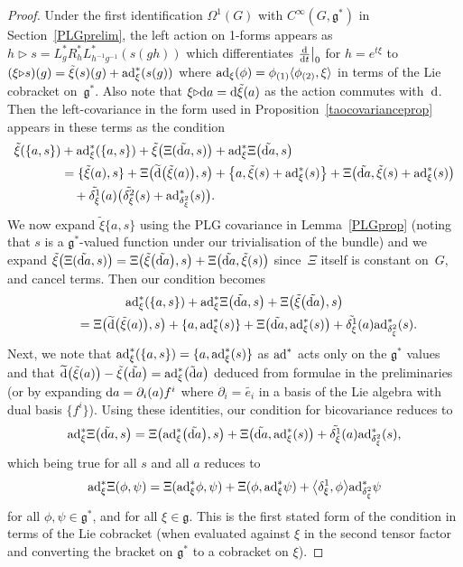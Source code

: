 \documentclass[10pt,a4paper]{amsart}
\numberwithin{equation}{section}
\newcommand{\<}{{\langle}}
\renewcommand{\>}{{\rangle}}
\renewcommand{\o}{{}_{\scriptstyle(1)}}
\renewcommand{\t}{{}_{\scriptstyle(2)}}
\newcommand{\extd}{{\rm d}}
\newcommand{\del}{{\partial}}
\newcommand{\la}{{\triangleright}}
\newcommand{\cg}{{\mathfrak{g}}}
\begin{document}
\begin{proof} Under the first identification $\Omega^1(G)$ with $C^\infty(G,\cg^*)$ in Section~\ref{PLGprelim}, the left action on 1-forms appears as $h\la s= L_g^*R_h^*L^*_{h^{-1}g^{-1}}(s(gh))$ which differentiates ${\extd \over\extd t}\big|_0$ for $h=e^{t\xi}$ to $(\xi\la s)(g)=\tilde\xi(s)(g)+ {\rm ad}_\xi^*(s(g))$ where ${\rm ad}_\xi(\phi)=\phi\o\<\phi\t,\xi\>$ in terms of the Lie cobracket on~$\cg^*$. Also note that $\xi\la\extd a=\extd\tilde\xi(a)$ as the action commutes with~$\extd$. Then the left-covariance in the form used in Proposition~\ref{taocovarianceprop} appears in these terms as the condition
\begin{align*} \tilde\xi(\{a,s\})&+{\rm ad}_\xi^*(\{a,s\})+ \tilde\xi\big(\Xi(\tilde{\extd a},s)\big) + {\rm ad}_\xi^*\Xi\big(\tilde{\extd a},s\big)\\
&=\{\tilde\xi(a),s\}+\Xi\big(\widetilde{\extd} \big(\tilde\xi(a)\big),s\big)+ \big\{a,\tilde\xi(s)+ {\rm ad}_\xi^*(s)\big\}+\Xi\big(\tilde{\extd a},\tilde\xi(s)+{\rm ad}_\xi^*(s)\big)\\
&\quad+\tilde{\delta^1_\xi}(a)\big(\tilde{\delta^2_\xi}(s)+{\rm ad}^*_{\delta^2_\xi}(s)\big).
\end{align*}
We now expand $\tilde\xi\{a,s\}$ using the PLG covariance in Lemma~\ref{PLGprop} (noting that $s$ is a $\cg^*$-valued function under our trivialisation of the bundle) and we expand $\tilde\xi\big(\Xi(\tilde{\extd a},s)\big)=\Xi\big(\tilde\xi\big(\tilde{\extd a}\big),s\big)+\Xi\big(\tilde{\extd a},\tilde\xi(s)\big)$ since~$\Xi$ itself is constant on~$G$, and cancel terms. Then our condition becomes
\begin{gather*}
{\rm ad}_\xi^*(\{a,s\})+ {\rm ad}_\xi^*\Xi\big(\tilde{\extd a},s\big)+ \Xi\big(\tilde\xi\big(\tilde{\extd a}\big),s\big)\\
\qquad{} =\Xi\big(\widetilde{\extd} \big(\tilde\xi(a)\big),s\big)+ \{a, {\rm ad}_\xi^*(s)\}+\Xi\big(\tilde{\extd a},{\rm ad}_\xi^*(s)\big)+\tilde{\delta^1_\xi}(a){\rm ad}^*_{\delta^2_\xi}(s).
\end{gather*}
Next, we note that ${\rm ad}_\xi^*(\{a,s\})= \{a, {\rm ad}_\xi^*(s)\}$ as ${\rm ad}^*$ acts only on the $\cg^*$ values and that $\widetilde{\extd} \big(\tilde\xi(a)\big)- \tilde\xi\big(\tilde{\extd a}\big)={\rm ad}_\xi^*\big(\tilde\extd a\big)$ deduced from formulae in the preliminaries (or by expanding $\extd a=\del_i(a)f^i$ where $\del_i=\tilde{e_i}$ in a basis of the Lie algebra with dual basis $\{f^i\}$). Using these identities, our condition for bicovariance reduces to
\[ {\rm ad}_\xi^*\Xi\big(\tilde{\extd a},s\big)=\Xi\big({\rm ad}_\xi^*\big(\tilde{\extd a}\big),s\big)+\Xi\big(\tilde{\extd a},{\rm ad}_\xi^*(s)\big)+\tilde{\delta^1_\xi}(a){\rm ad}^*_{\delta^2_\xi}(s),\]
which being true for all $s$ and all $a$ reduces to
\[ {\rm ad}_\xi^*\Xi(\phi,\psi)=\Xi({\rm ad}_\xi^*\phi,\psi)+\Xi(\phi,{\rm ad}_\xi^*\psi)+\big\langle\delta^1_\xi,\phi\big\rangle {\rm ad}^*_{\delta^2_\xi}\psi\]
for all $\phi,\psi\in\cg^*$, and for all $\xi\in\cg$. This is the first stated form of the condition in terms of the Lie cobracket (when evaluated against $\xi$ in the second tensor factor and converting the bracket on $\cg^*$ to a cobracket on $\xi$). \end{proof}
\end{document}
